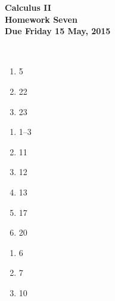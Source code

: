 \documentclass[12pt]{article}
\begin{document}
\pagestyle{empty}
 
\begin{center}
{\large {\bf Calculus II}}\\
\medskip
{\large {\bf Homework Seven}}\\
\medskip
{ {\bf Due Friday 15 May, 2015}}\\
\end{center}

\hspace{2mm}\\
   


\begin{enumerate}
\setlength{\itemsep}{-1mm}
  \item 5
  \item 22
  \item 23
\end{enumerate}




\begin{enumerate}
\setlength{\itemsep}{-1mm}
  \item 1--3
  \item 11
  \item 12
  \item 13
  \item 17
  \item 20 
\end{enumerate}

\begin{enumerate}
\setlength{\itemsep}{-1mm}
  \item 6
  \item 7
  \item 10
\end{enumerate}
\end{document}
